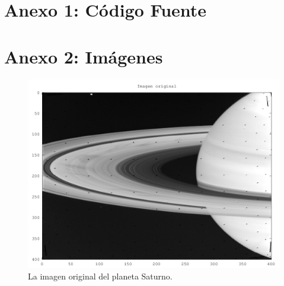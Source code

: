 \documentclass[twocolumn,a4paper,10pt]{article}
\begin{document}
\clearpage
\section*{Anexo 1: C\'odigo Fuente}
    
    
    
    
    
    
    
    \newpage
    


\clearpage
\section*{Anexo 2: Im\'agenes}

\begin{figure}[H]
        \includegraphics[width=\linewidth]{../images/saturno.png}
        \caption{La imagen original del planeta Saturno.}
        \label{fig:saturno}
\end{figure}
\end{document}

